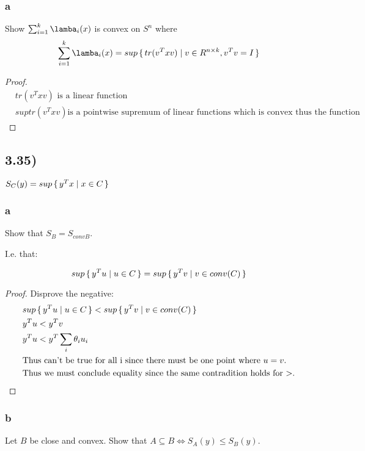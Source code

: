 \documentclass[12pt]{article}
\begin{document}
\subsubsection*{a}

Show $\sum_{i=1}^{k}\lamba_i(x)$ is convex on $S^n$ where 
$$\sum_{i=1}^{k}\lamba_i(x) = sup \set{tr(v^Txv)| v \in R^{n \times k}, v^Tv = I}$$

\begin{proof}
\begin{align*}
& tr(v^Txv) \text{ is a linear function}\\
& sup{tr(v^Txv)} \text{is a pointwise supremum of linear functions which is convex thus the function is convex.}
\end{align*}
\end{proof}


\subsection*{3.35)}
$S_C(y) = sup\set{y^Tx |x \in C}$

\subsubsection*{a}
Show that $S_B = S_{convB}$.

I.e. that:

$$sup\set{y^Tu | u \in C} = sup\set{y^Tv | v \in conv(C)}$$

\begin{proof}
Disprove the negative:
\begin{align*}
& sup\set{y^Tu | u \in C} < sup\set{y^Tv | v \in conv(C)}\\
& y^Tu < y^Tv\\
& y^Tu < y^T\sum_{i}\theta_i u_i\\
& \text{Thus can't be true for all i since there must be one point where $u=v$.}\\
& \text{Thus we must conclude equality since the same contradition holds for $>$.} 
\end{align*}
\end{proof}

\subsubsection*{b}
Let $B$ be close and convex. Show that $A \subseteq B \Leftrightarrow S_A(y) \le S_B(y)$.
\end{document}
